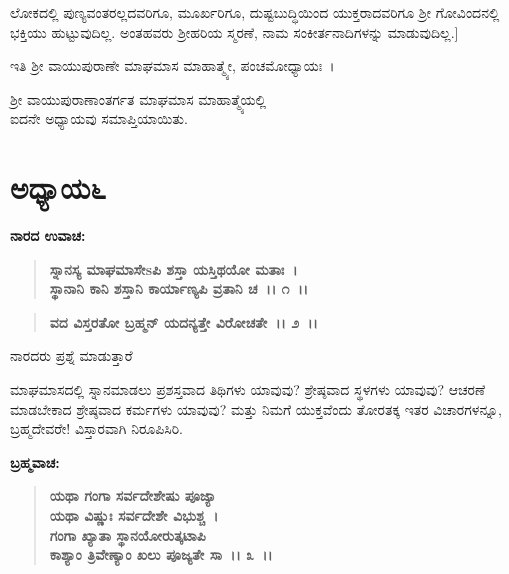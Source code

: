 ಲೋಕದಲ್ಲಿ ಪುಣ್ಯವಂತರಲ್ಲದವರಿಗೂ, ಮೂರ್ಖರಿಗೂ, ದುಷ್ಟಬುದ್ಧಿಯಿಂದ ಯುಕ್ತ\-ರಾದವರಿಗೂ ಶ‍್ರೀ ಗೋವಿಂದನಲ್ಲಿ ಭಕ್ತಿಯು ಹುಟ್ಟುವುದಿಲ್ಲ. ಅಂತಹವರು ಶ‍್ರೀಹರಿಯ ಸ್ಮರಣೆ, ನಾಮ ಸಂಕೀರ್ತನಾದಿಗಳನ್ನು ಮಾಡುವುದಿಲ್ಲ.]

\begin{center}
ಇತಿ ಶ‍್ರೀ ವಾಯುಪುರಾಣೇ ಮಾಘಮಾಸ ಮಾಹಾತ್ಮ್ಯೇ, ಪಂಚಮೋಧ್ಯಾಯಃ~।
\end{center}

\begin{center}
ಶ‍್ರೀ ವಾಯುಪುರಾಣಾಂತರ್ಗತ ಮಾಘಮಾಸ ಮಾಹಾತ್ಮ್ಯೆಯಲ್ಲಿ \\ ಐದನೇ ಅಧ್ಯಾಯವು ಸಮಾಪ್ತಿಯಾಯಿತು.
\end{center}

\newpage

\section*{ಅಧ್ಯಾಯ\enginline{-}೬}

\emptypage

\begin{flushleft}
\textbf{ನಾರದ ಉವಾಚ:\enginline{-}}
\end{flushleft}

\begin{verse}
\textbf{ಸ್ನಾನಸ್ಯ ಮಾಘಮಾಸೇsಪಿ ಶಸ್ತಾ ಯಸ್ತಿಥಯೋ ಮತಾಃ~।}\\\textbf{ಸ್ಥಾನಾನಿ ಕಾನಿ ಶಸ್ತಾನಿ ಕಾರ್ಯಾಣ್ಯಪಿ ವ್ರತಾನಿ ಚ~।। ೧~।।}
\end{verse}

\begin{verse}
\textbf{ವದ ವಿಸ್ತರತೋ ಬ್ರಹ್ಮನ್ ಯದನ್ಯತ್ತೇ ವಿರೋಚತೇ~।। ೨~।।}
\end{verse}

\begin{flushleft}
ನಾರದರು ಪ್ರಶ್ನೆ ಮಾಡುತ್ತಾರೆ\enginline{-}
\end{flushleft}

ಮಾಘಮಾಸದಲ್ಲಿ ಸ್ನಾನಮಾಡಲು ಪ್ರಶಸ್ತವಾದ ತಿಥಿಗಳು ಯಾವುವು? ಶ್ರೇಷ್ಠವಾದ ಸ್ಥಳಗಳು ಯಾವುವು? ಆಚರಣೆ ಮಾಡಬೇಕಾದ ಶ್ರೇಷ್ಠವಾದ ಕರ್ಮಗಳು ಯಾವುವು? ಮತ್ತು ನಿಮಗೆ ಯುಕ್ತವೆಂದು ತೋರತಕ್ಕ ಇತರ ವಿಚಾರಗಳನ್ನೂ, ಬ್ರಹ್ಮದೇವರೇ! ವಿಸ್ತಾರವಾಗಿ ನಿರೂಪಿಸಿರಿ.

\noindent
\textbf{ಬ್ರಹ್ಮವಾಚ:\enginline{-}}

\begin{verse}
\textbf{ಯಥಾ ಗಂಗಾ ಸರ್ವದೇಶೇಷು ಪೂಜ್ಯಾ}\\\textbf{ಯಥಾ ವಿಷ್ಣುಃ ಸರ್ವದೇಶೇ ವಿಭುಶ್ಚ~। }\\\textbf{ಗಂಗಾ ಖ್ಯಾತಾ ಸ್ಥಾನಯೋರುತ್ಕಟಾಪಿ} \\\textbf{ಕಾಶ್ಯಾಂ ತ್ರಿವೇಣ್ಯಾಂ ಖಲು ಪೂಜ್ಯತೇ ಸಾ~।। ೩~।।}
\end{verse}

